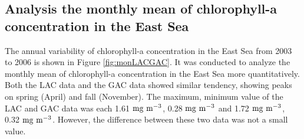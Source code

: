
\subsection{Analysis the monthly mean of chlorophyll-a concentration in the East Sea}


The annual variability of chlorophyll-a concentration in the East Sea from 2003 to 2006 is shown in Figure \ref{fig:monLACGAC}. It was conducted to analyze the monthly mean of chlorophyll-a concentration in the East Sea more quantitatively. Both the LAC data and the GAC data showed similar tendency, showing peaks on spring (April) and fall (November). The maximum, minimum value of the LAC and GAC data was each 1.61 $\rm mg~m^{-3}$, 0.28 $\rm mg~m^{-3}$ and 1.72 $\rm mg~m^{-3}$, 0.32 $\rm mg~m^{-3}$.  However, the difference between these two data was not a small value.



